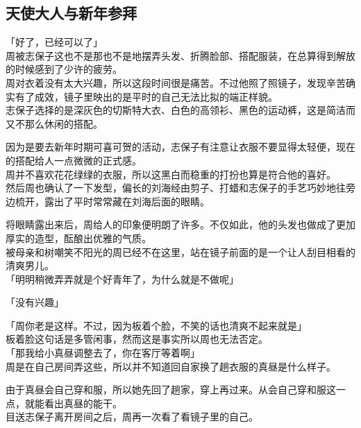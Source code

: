 \subsection{天使大人与新年参拜}

「好了，已经可以了」\\

周被志保子这也不是那也不是地摆弄头发、折腾脸部、搭配服装，在总算得到解放的时候感到了少许的疲劳。\\

周对衣着没有太大兴趣，所以这段时间很是痛苦。不过他照了照镜子，发现辛苦确实有了成效，镜子里映出的是平时的自己无法比拟的端正样貌。\\

志保子选择的是深灰色的切斯特大衣、白色的高领衫、黑色的运动裤，这是简洁而又不那么休闲的搭配。

因为是要去新年时期可喜可贺的活动，志保子有注意让衣服不要显得太轻便，现在的搭配给人一点微微的正式感。\\

周并不喜欢花花绿绿的衣服，所以这黑白而稳重的打扮也算是符合他的喜好。\\

然后周也确认了一下发型，偏长的刘海经由剪子、打蜡和志保子的手艺巧妙地往旁边梳开，露出了平时常常藏在刘海后面的眼睛。

将眼睛露出来后，周给人的印象便明朗了许多。不仅如此，他的头发也做成了更加厚实的造型，酝酿出优雅的气质。\\

被母亲和树嘲笑不阳光的周已经不在这里，站在镜子前面的是一个让人刮目相看的清爽男儿。\\

「明明稍微弄弄就是个好青年了，为什么就是不做呢」

「没有兴趣」

「周你老是这样。不过，因为板着个脸，不笑的话也清爽不起来就是」\\

板着脸这句话是多管闲事，然而这是事实所以周也无法否定。\\

「那我给小真昼调整去了，你在客厅等着啊」\\

周是在自己房间弄这些，所以并不知道回自家换了趟衣服的真昼是什么样子。

由于真昼会自己穿和服，所以她先回了趟家，穿上再过来。从会自己穿和服这一点，就能看出真昼的能干。\\

目送志保子离开房间之后，周再一次看了看镜子里的自己。\\

